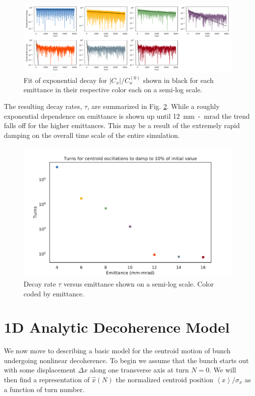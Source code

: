 \documentclass[aps,prstab,twocolumn, groupedaddress]{revtex4-1}
\begin{document}
\begin{figure}
	\includegraphics[width=\textwidth]{decay_rate_fits.pdf}%
	\caption{Fit of exponential decay  for $\left| C_x \right| / C_x^{(0)} $ shown in black for 
	each emittance in their respective color each on a semi-log scale. }
	\label{fig:decayfits} 
\end{figure}

The resulting decay rates, $\tau$, are summarized in Fig. \ref{fig:decayemit}. While a 
roughly exponential dependence on emittance is shown up until \SI{12}{mm-mrad} the 
trend falls off for the higher emittances. This may be a result of the extremely rapid 
damping on the overall time scale of the entire simulation.

\begin{figure}
	\includegraphics[width=\columnwidth]{decay_time.pdf}%
	\caption{Decay rate $\tau$ versus emittance shown on a semi-log scale. Color coded by 
	emittance.}
	\label{fig:decayemit} 
\end{figure}

\section{1D Analytic Decoherence Model}
We now move to describing a basic model for the centroid motion of bunch undergoing 
nonlinear decoherence. To begin we assume that the bunch starts out with some 
displacement $\Delta x$ along one transverse axis at turn $N=0$. We will then find a 
representation of  $\hat{x}(N)$ the normalized centroid position $\left\langle x 
\right\rangle 
/ \sigma_x$ as a function of turn number. 
\end{document}
